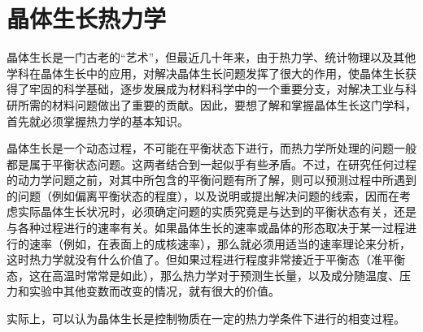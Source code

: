 ﻿\chapter{晶体生长热力学}
晶体生长是一门古老的“艺术”，但最近几十年来，由于热力学、统计物理以及其他学科在晶体生长中的应用，对解决晶体生长问题发挥了很大的作用，使晶体生长获得了牢固的科学基础，逐步发展成为材料科学中的一个重要分支，对解决工业与科研所需的材料问题做出了重要的贡献。因此，要想了解和掌握晶体生长这门学科，首先就必须掌握热力学的基本知识。

晶体生长是一个动态过程，不可能在平衡状态下进行，而热力学所处理的问题一般都是属于平衡状态问题。这两者结合到一起似乎有些矛盾。不过，在研究任何过程的动力学问题之前，对其中所包含的平衡问题有所了解，则可以预测过程中所遇到的问题（例如偏离平衡状态的程度），以及说明或提出解决问题的线索，因而在考虑实际晶体生长状况时，必须确定问题的实质究竟是与达到的平衡状态有关，还是与各种过程进行的速率有关。如果晶体生长的速率或晶体的形态取决于某一过程进行的速率（例如，在表面上的成核速率），那么就必须用适当的速率理论来分析，这时热力学就没有什么价值了。但如果过程进行程度非常接近于平衡态（准平衡态，这在高温时常常是如此），那么热力学对于预测生长量，以及成分随温度、压力和实验中其他变数而改变的情况，就有很大的价值。

实际上，可以认为晶体生长是控制物质在一定的热力学条件下进行的相变过程。


